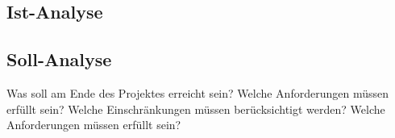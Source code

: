 
\subsection{Ist-Analyse}
\subsection{Soll-Analyse}
Was soll am Ende des Projektes erreicht sein?
Welche Anforderungen müssen erfüllt sein?
Welche Einschränkungen müssen berücksichtigt werden?
Welche Anforderungen müssen erfüllt sein?